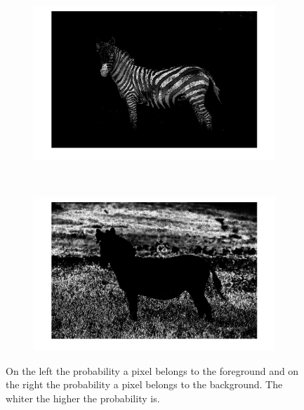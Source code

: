 \documentclass{paper}
\begin{document}
\begin{figure}[H]
    \centering
    \begin{subfigure}{0.45\textwidth}
        \includegraphics[width=\textwidth]{../../outputs/p4/image_segmentation/zebra/gamma20/prob_fg}
    \end{subfigure}
    ~
        \begin{subfigure}{0.45\textwidth}
        \includegraphics[width=\textwidth]{../../outputs/p4/image_segmentation/zebra/gamma20/prob_bg}
    \end{subfigure}
    
    \caption{On the left the probability a pixel belongs to the foreground and on the right the probability a pixel belongs to the background. The whiter the higher the probability is.}
    \label{fig:segmentation_zebra_probabilities}       
\end{figure}
\end{document}
